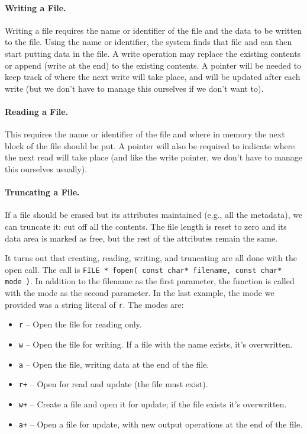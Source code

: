 \documentclass[a4paper]{report}
\begin{document}
\paragraph{Writing a File.} Writing a file requires the name or identifier of the file and the data to be written to the file. Using the name or identifier, the system finds that file and can then start putting data in the file. A write operation may replace the existing contents or append (write at the end) to the existing contents. A pointer will be needed to keep track of where the next write will take place, and will be updated after each write (but we don't have to manage this ourselves if we don't want to).

\paragraph{Reading a File.} This requires the name or identifier of the file and where in memory the next block of the file should be put. A pointer will also be required to indicate where the next read will take place (and like the write pointer, we don't have to manage this ourselves usually).

\paragraph{Truncating a File.} If a file should be erased but its attributes maintained (e.g., all the metadata), we can truncate it: cut off all the contents. The file length is reset to zero and its data area is marked as free, but the rest of the attributes remain the same.


It turns out that creating, reading, writing, and truncating are all done with the open call. The call is \texttt{FILE * fopen( const char* filename, const char* mode )}. In addition to the filename as the first parameter, the function is called with the mode as the second parameter. In the last example, the mode we provided was a string literal of \texttt{r}. The modes are:

\begin{itemize}
	\item \texttt{r} -- Open the file for reading only.
	\item \texttt{w} -- Open the file for writing. If a file with the name exists, it's overwritten.
	\item \texttt{a} -- Open the file, writing data at the end of the file.
	\item \texttt{r+} -- Open for read and update (the file must exist).
	\item \texttt{w+} -- Create a file and open it for update; if the file exists it's overwritten.
	\item \texttt{a+} -- Open a file for update, with new output operations at the end of the file.
\end{itemize}
\end{document}
